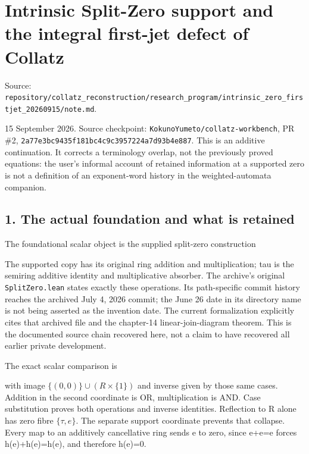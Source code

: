 \chapter{Intrinsic Split-Zero support and the integral first-jet defect
of Collatz}
{\small\sffamily Source: \nolinkurl{repository/collatz_reconstruction/research_program/intrinsic_zero_firstjet_20260915/note.md}.\par}


15 September 2026. Source checkpoint:
\nolinkurl{KokunoYumeto/collatz-workbench}, PR \#2,
\nolinkurl{2a77e3bc9435f181bc4c9c3957224a7d93b4e887}. This is an
additive continuation. It corrects a terminology overlap, not the
previously proved equations: the user's informal account of retained
information at a supported zero is not a definition of an exponent-word
history in the weighted-automata companion.

\section{1. The actual foundation and what is retained}

The foundational scalar object is the supplied split-zero construction


The supported copy has its original ring addition and multiplication;
tau is the semiring additive identity and multiplicative absorber. The
archive's original \nolinkurl{SplitZero.lean} states exactly these
operations. Its path-specific commit history reaches the archived July
4, 2026 commit; the June 26 date in its directory name is not being
asserted as the invention date. The current formalization explicitly
cites that archived file and the chapter-14 linear-join-diagram theorem.
This is the documented source chain recovered here, not a claim to have
recovered all earlier private development.

The exact scalar comparison is


with image \(\{(0,0)\}\cup(R\times\{1\})\) and inverse given by those
same cases. Addition in the second coordinate is OR, multiplication is
AND. Case substitution proves both operations and inverse identities.
Reflection to R alone has zero fibre \(\{\tau,e\}\). The separate
support coordinate prevents that collapse. Every map to an additively
cancellative ring sends e to zero, since e+e=e forces h(e)+h(e)=h(e),
and therefore h(e)=0.

